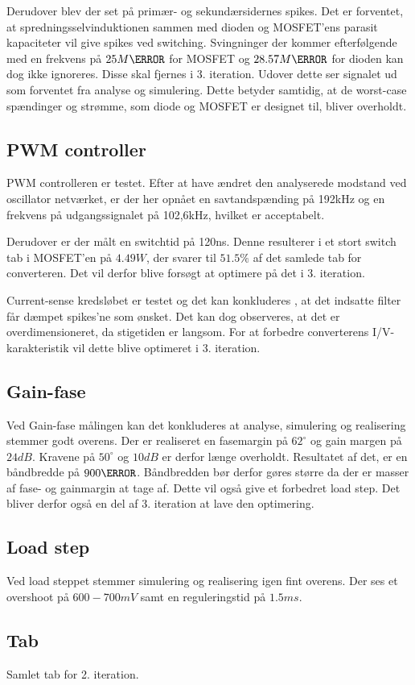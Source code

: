 Derudover blev der set på primær- og sekundærsidernes spikes. Det er forventet, at spredningsselvinduktionen sammen med dioden og MOSFET'ens parasit kapaciteter vil give spikes ved switching. Svingninger der kommer efterfølgende med en frekvens på $25M\hertz$ for MOSFET og $28.57M\hertz$ for dioden kan dog ikke ignoreres. Disse skal fjernes i 3. iteration. Udover dette ser signalet ud som forventet fra analyse og simulering. Dette betyder samtidig, at de worst-case spændinger og strømme, som diode og MOSFET er designet til, bliver overholdt.

\subsection{PWM controller} 
PWM controlleren er testet. Efter at have ændret den analyserede modstand ved oscillator netværket, er der her opnået en savtandspænding på 192kHz og en frekvens på udgangssignalet på 102,6kHz, hvilket er acceptabelt.

Derudover er der målt en switchtid på 120ns. Denne resulterer i et stort switch tab i MOSFET'en på $4.49W$, der svarer til $51.5\percent$ af det samlede tab for converteren.  Det vil derfor blive forsøgt at optimere på det i 3. iteration. 

Current-sense kredsløbet er testet og det kan konkluderes , at det indsatte filter får dæmpet spikes'ne som ønsket. Det kan dog observeres, at det er overdimensioneret, da stigetiden er langsom. For at forbedre converterens I/V-karakteristik vil dette blive optimeret i 3. iteration. 

\subsection{Gain-fase}
Ved Gain-fase målingen kan det konkluderes at analyse, simulering og realisering stemmer godt overens. Der er realiseret en fasemargin på $62^\circ$ og gain margen på $24dB.$ Kravene på $50^\circ$ og $10dB$ er derfor længe overholdt. Resultatet af det, er en båndbredde på $900\hertz$. Båndbredden bør derfor gøres større da der er masser af fase- og gainmargin at tage af. Dette vil også give et forbedret load step. Det bliver derfor også en del af 3. iteration at lave den optimering.  

\subsection{Load step}
Ved load steppet stemmer simulering og realisering igen fint overens. Der ses et overshoot på $600-700mV$ samt en reguleringstid på $1.5ms$.
 
  
\subsection{Tab}
Samlet tab for 2. iteration.
